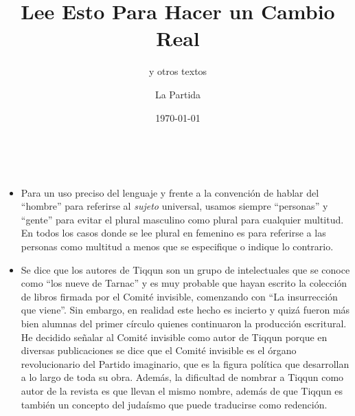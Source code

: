 \documentclass[fontsize=11pt,chapterprefix=false,headings=big,headsepline=on,paper=5.500in:8.50in,DIV=11,BCOR=5mm,parskip=half+]{scrbook}
\title{Lee Esto Para Hacer un Cambio Real}
\subtitle{y otros textos}
\author{La Partida}
\date{\today}
\begin{document}
\frontmatter
\maketitle

\cleardoubleemptypage%
\textcolor{white}{.}\\



\begin{itemize}
\item
  Para un uso preciso del lenguaje y frente a la convención de hablar
  del ``hombre'' para referirse al \emph{sujeto} universal, usamos
  siempre ``personas'' y ``gente'' para evitar el plural masculino como
  plural para cualquier multitud. En todos los casos donde se lee plural
  en femenino es para referirse a las personas como multitud a menos que
  se especifique o indique lo contrario.
\item
  Se dice que los autores de Tiqqun son un grupo de intelectuales que se
  conoce como ``los nueve de Tarnac'' y es muy probable que hayan
  escrito la colección de libros firmada por el Comité invisible,
  comenzando con ``La insurrección que viene''. Sin embargo, en realidad
  este hecho es incierto y quizá fueron más bien alumnas del primer
  círculo quienes continuaron la producción escritural. He decidido
  señalar al Comité invisible como autor de Tiqqun porque en diversas
  publicaciones se dice que el Comité invisible es el órgano
  revolucionario del Partido imaginario, que es la figura política que
  desarrollan a lo largo de toda su obra. Además, la dificultad de
  nombrar a Tiqqun como autor de la revista es que llevan el mismo
  nombre, además de que Tiqqun es también un concepto del judaísmo que
  puede traducirse como redención.
\end{itemize}

\end{document}
